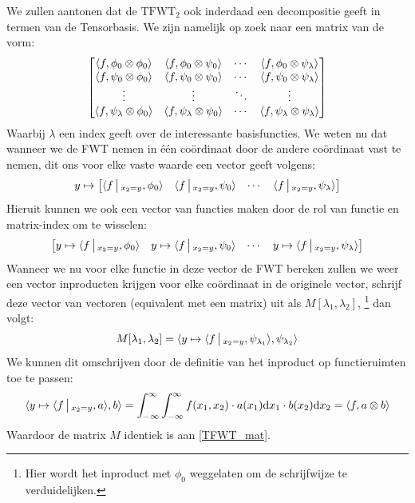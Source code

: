 We zullen aantonen dat de $\mathrm{TFWT}_2$ ook inderdaad een decompositie geeft in termen van de Tensorbasis.
We zijn namelijk op zoek naar een matrix van de vorm:
\begin{equation}
\label{TFWT_mat}
\begin{bmatrix}
\langle f , \phi_0\otimes\phi_0 \rangle     & \langle f , \phi_0\otimes\psi_0 \rangle     & \cdots & \langle f , \phi_0\otimes\psi_\lambda \rangle \\
\langle f , \psi_0\otimes\phi_0 \rangle     & \langle f , \psi_0\otimes\psi_0 \rangle     & \cdots & \langle f , \psi_0\otimes\psi_\lambda \rangle \\ 
           \vdots                 &         \vdots                    & \ddots &                \vdots  \\ 
\langle f , \psi_\lambda\otimes\phi_0 \rangle & \langle f , \psi_\lambda\otimes\psi_0 \rangle 
& \cdots & \langle f , \psi_\lambda\otimes\psi_\lambda \rangle \\
\end{bmatrix}
\end{equation}
Waarbij $\lambda$ een index geeft over de interessante basisfuncties.
We weten nu dat wanneer we de FWT nemen in \'e\'en co\"ordinaat door de andere co\"ordinaat vast te nemen,
 dit ons voor elke vaste waarde een vector geeft volgens:
\[
y \mapsto
\begin{bmatrix}
\langle f\,\big|\,_{x_2=y} , \phi_0 \rangle & 
\langle f\,\big|\,_{x_2=y} , \psi_0 \rangle & \cdots & 
\langle f\,\big|\,_{x_2=y} , \psi_\lambda \rangle
\end{bmatrix}
\]
Hieruit kunnen we ook een vector van functies maken door de rol van functie en matrix-index om te wisselen:
\[
\begin{bmatrix}
y \mapsto \langle f\,\big|\,_{x_2=y} , \phi_0 \rangle & 
y \mapsto \langle f\,\big|\,_{x_2=y} , \psi_0 \rangle & \cdots & 
y \mapsto \langle f\,\big|\,_{x_2=y} , \psi_\lambda \rangle
\end{bmatrix}
\]
Wanneer we nu voor elke functie in deze vector de FWT bereken zullen we weer een vector inproducten krijgen
voor elke co\"ordinaat in de originele vector, schrijf deze vector van vectoren (equivalent met een matrix) uit als 
$M[\lambda_1,\lambda_2]$,
\footnote{Hier wordt het inproduct met $\phi_0$ weggelaten om de schrijfwijze te verduidelijken.}
dan volgt:
\[
M[\lambda_1,\lambda_2] = \langle y\mapsto \langle f\,\big|\,_{x_2=y} , \psi_{\lambda_1} \rangle , \psi_{\lambda_2} \rangle
\]
We kunnen dit omschrijven door de definitie van het inproduct op functieruimten toe te passen:
\[
\langle y\mapsto \langle f\,\big|\,_{x_2=y} , a \rangle , b \rangle = 
\int_{-\infty}^\infty\int_{-\infty}^\infty f(x_1,x_2) \cdot a(x_1) {\mathrm{d} x_1} \cdot b(x_2) {\mathrm{d} x_2} = \langle f , a\otimes b \rangle 
\]
Waardoor de matrix $M$ identiek is aan \ref{TFWT_mat}. 

